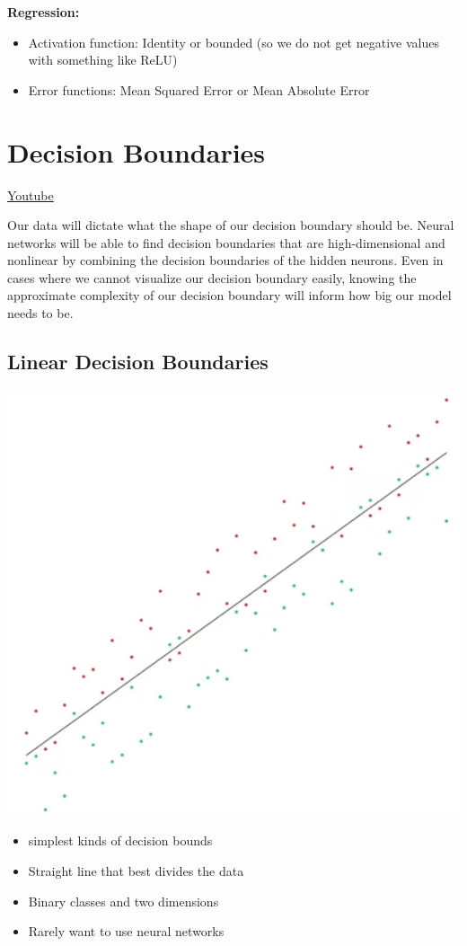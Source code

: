 \textbf{Regression:}
\begin{itemize}
    \item Activation function: Identity or bounded (so we do not get negative values with something like ReLU)
    \item Error functions: Mean Squared Error or Mean Absolute Error
\end{itemize}

\section{Decision Boundaries}
\href{https://www.youtube.com/watch?v=aPgH8Ra30T0&ab_channel=Udacity}{Youtube} \newline

Our data will dictate what the shape of our decision boundary should be. Neural networks will be able to find decision boundaries that are high-dimensional and nonlinear by combining the decision boundaries of the hidden neurons. Even in cases where we cannot visualize our decision boundary easily, knowing the approximate complexity of our decision boundary will inform how big our model needs to be. 

\subsection{Linear Decision Boundaries}
\includegraphics[width=0.25\linewidth]{img//intro//introNN/image4.png}
\begin{itemize}
    \item simplest kinds of decision bounds
    \item Straight line that best divides the data
    \item Binary classes and two dimensions
    \item Rarely want to use neural networks
\end{itemize}

